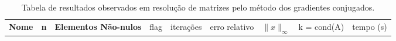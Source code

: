 \begin{table}[H]
    \centering
    \begin{tabular}{|c|c|c|c|c|c|c|c|c|}
        \hline \rowcolor{Gray}
        \multicolumn{9}{|c|}{Jacobi }\\
        \hline
         \rowcolor{Gray}
         \bfseries Nome & \bfseries n & \bfseries Elementos Não-nulos & flag & iterações &
         erro relativo &
         $\|x\|_\infty$ &
         k = cond(A) & tempo (s) \\
         \hline 
         
         
         
         
    \end{tabular}
    \caption{Tabela de resultados observados em resolução de matrizes pelo método dos gradientes conjugados.}
    \label{tab:resultados}
\end{table}
